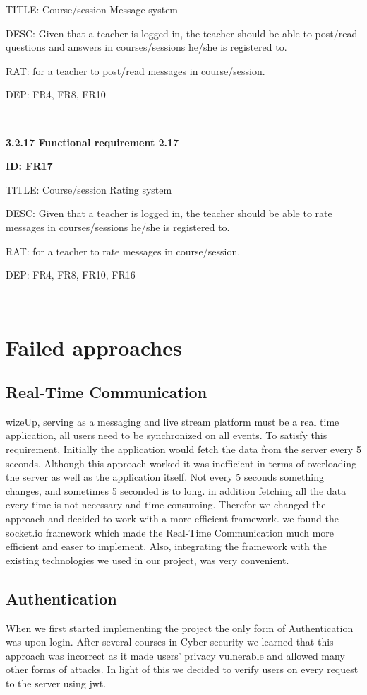 \documentclass[12pt,a4paper]{article}
\begin{document}
\begin{flushleft}
        TITLE: Course/session Message system

        DESC: Given that a teacher is logged in, the teacher should be able to post/read questions and answers in courses/sessions he/she is registered to.

        RAT: for a teacher to post/read messages in course/session.

        DEP: FR4, FR8, FR10

        \

        \textbf{3.2.17 Functional requirement 2.17}

        \textbf{ID: FR17}

        TITLE: Course/session Rating system

        DESC: Given that a teacher is logged in, the teacher should be able to rate messages in courses/sessions he/she is registered to.

        RAT: for a teacher to rate messages in course/session.

        DEP: FR4, FR8, FR10, FR16

        \
\end{flushleft}

    \newpage
    \section{Failed approaches}
    \subsection{Real-Time Communication}
    wizeUp, serving as a messaging and live stream platform must be a real time application, all users need to be synchronized on all events. To satisfy this requirement, Initially the application would fetch the data from the server every 5 seconds. Although this approach worked it was inefficient in terms of overloading the server as well as the application itself. Not every 5 seconds something changes, and sometimes 5 seconded is to long. in addition fetching all the data every time is not necessary and time-consuming. Therefor we changed the approach and decided to work with a more efficient framework. we found the socket.io framework which made the Real-Time Communication much more efficient and easer to implement. Also, integrating the framework with the existing technologies we used in our project, was very convenient.

    \subsection{Authentication}
    When we first started implementing the project the only form of Authentication was upon login. After several courses in Cyber security we learned that this approach was incorrect as it made users' privacy vulnerable and allowed many other forms of attacks. In light of this we decided to verify users on every request to the server using jwt.
\end{document}

